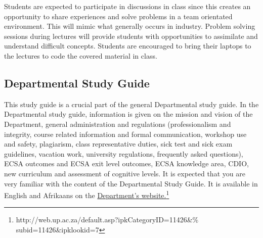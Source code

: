   Students are expected to participate in discussions in class since
  this creates an opportunity to share experiences and solve problems
  in a team orientated environment. This will mimic what generally
  occurs in industry. Problem solving sessions during lectures will
  provide students with opportunities to assimilate and understand
  difficult concepts. Students are encouraged to bring their laptops
  to the lectures to code the covered material in class.

    \subsection{Departmental Study Guide} \label{sec:dep_study_guide}
        This study guide is a crucial part of the general Departmental study guide.
        In the Departmental study guide, information is given
        on the mission and vision of the Department, general administration and
        regulations (professionalism and integrity, course related information
        and formal communication, workshop use and safety, plagiarism, class
        representative duties, sick test and sick exam guidelines, vacation
        work, university regulations, frequently asked questions), ECSA
        outcomes and ECSA exit level outcomes, ECSA knowledge area, CDIO,
        new curriculum and assessment of cognitive levels. It is expected that
        you are very familiar with the content of the Departmental Study Guide.
        It is available in English and Afrikaans on the
        \href{http://web.up.ac.za/default.asp?ipkCategoryID=11426&%
                subid=11426&ipklookid=7}%
                {Department’s website.\footnote{\label{note3}%
                    \url{http://web.up.ac.za/default.asp?ipkCategoryID=11426&%
                        subid=11426&ipklookid=7}}}

